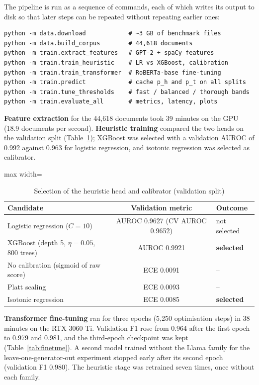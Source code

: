 The pipeline is run as a sequence of commands, each of which writes its output
to disk so that later steps can be repeated without repeating earlier ones:
\begin{lstlisting}[language={},numbers=none,caption={Commands that reproduce the reported results},label={lst:pipeline}]
python -m data.download            # ~3 GB of benchmark files
python -m data.build_corpus        # 44,618 documents
python -m train.extract_features   # GPT-2 + spaCy features
python -m train.train_heuristic    # LR vs XGBoost, calibration
python -m train.train_transformer  # RoBERTa-base fine-tuning
python -m train.predict            # cache p_h and p_t on all splits
python -m train.tune_thresholds    # fast / balanced / thorough bands
python -m train.evaluate_all       # metrics, latency, plots
\end{lstlisting}

\textbf{Feature extraction} for the 44,618 documents took 39 minutes on the GPU
(18.9 documents per second). \textbf{Heuristic training} compared the two
heads on the validation split (Table~\ref{tab:headselect}); XGBoost was
selected with a validation AUROC of 0.992 against 0.963 for logistic
regression, and isotonic regression was selected as calibrator.

\begin{table}[H]
\caption{Selection of the heuristic head and calibrator (validation split)}
\label{tab:headselect}
\centering
\small
\begin{adjustbox}{max width=\textwidth}\begin{tabular}{|l|c|l|}
\hline
\textbf{Candidate} & \textbf{Validation metric} & \textbf{Outcome} \\ \hline
Logistic regression ($C=10$) & AUROC 0.9627 (CV AUROC 0.9652) & not selected \\ \hline
XGBoost (depth 5, $\eta=0.05$, 800 trees) & AUROC 0.9921 & \textbf{selected} \\ \hline
No calibration (sigmoid of raw score) & ECE 0.0091 & -- \\ \hline
Platt scaling & ECE 0.0093 & -- \\ \hline
Isotonic regression & ECE 0.0085 & \textbf{selected} \\ \hline
\end{tabular}\end{adjustbox}
\end{table}

\textbf{Transformer fine-tuning} ran for three epochs (5,250 optimisation steps)
in 38 minutes on the RTX 3060 Ti. Validation F1 rose from 0.964 after the first
epoch to 0.979 and 0.981, and the third-epoch checkpoint was kept
(Table~\ref{tab:finetune}). A second model trained without the Llama family
for the leave-one-generator-out experiment stopped early after its second
epoch (validation F1 0.980). The heuristic stage was retrained seven times,
once without each family.

